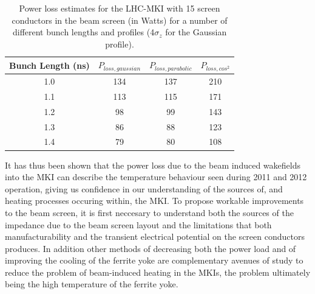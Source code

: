 \begin{table}
\caption{Power loss estimates for the LHC-MKI with 15 screen conductors in the beam screen (in Watts) for a number of different bunch lengths and profiles (4$\sigma_{z}$ for the Gaussian profile).}
\label{tab:mki-15-heating}
\begin{center}
\begin{tabular}{c | c | c | c}
Bunch Length (ns) & $P_{loss, gaussian}$ & $P_{loss, parabolic}$ & $P_{loss, cos^{2}}$ \\ \hline
1.0 & 134 & 137 & 210 \\ \hline
1.1 & 113 & 115 & 171 \\ \hline
1.2 & 98 & 99 & 143 \\ \hline
1.3 & 86 & 88 & 123 \\ \hline
1.4 & 79 & 80 & 108 \\ \hline
\end{tabular}
\end{center}
\end{table}

It has thus been shown that the power loss due to the beam induced wakefields into the MKI can describe the temperature behaviour seen during 2011 and 2012 operation, giving us confidence in our understanding of the sources of, and heating processes occuring within, the MKI. To propose workable improvements to the beam screen, it is first neccesary to understand both the sources of the impedance due to the beam screen layout and the limitations that both manufacturability and the transient electrical potential on the screen conductors produces. In addition other methods of decreasing both the power load and of improving the cooling of the ferrite yoke are complementary avenues of study to reduce the problem of beam-induced heating in the MKIs, the problem ultimately being the high temperature of the ferrite yoke.

